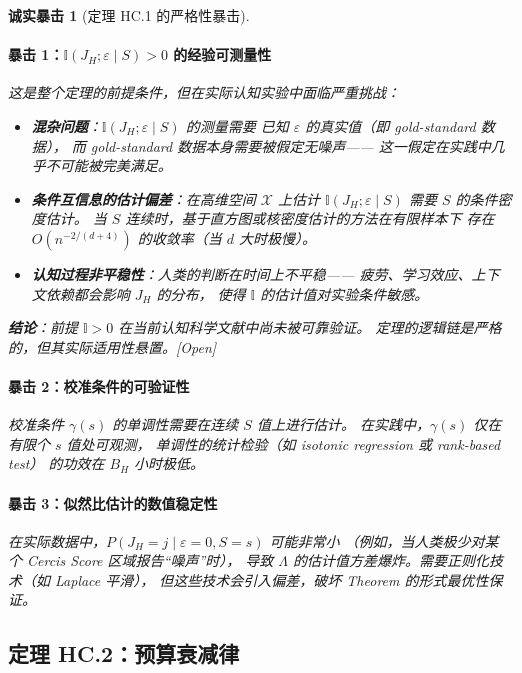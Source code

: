 \documentclass[12pt,a4paper]{article}
\newtheorem{critique}[theorem]{诚实暴击}
\newcommand{\openquest}{\textcolor{red!70!black}{\small\textsf{[Open]}}}
\newcommand{\I}{\mathbb{I}}
\newcommand{\cX}{\mathcal{X}}
\begin{document}
\begin{critique}[定理 HC.1 的严格性暴击]

\paragraph{暴击 1：$\I(J_H; \varepsilon \mid S) > 0$ 的经验可测量性}
这是整个定理的前提条件，但在实际认知实验中面临严重挑战：
\begin{itemize}
    \item \textbf{混杂问题}：$\I(J_H; \varepsilon \mid S)$ 的测量需要
          已知 $\varepsilon$ 的真实值（即 gold-standard 数据），
          而 gold-standard 数据本身需要被假定无噪声——
          这一假定在实践中几乎不可能被完美满足。
    \item \textbf{条件互信息的估计偏差}：在高维空间 $\cX$ 上估计
          $\I(J_H; \varepsilon \mid S)$ 需要 $S$ 的条件密度估计。
          当 $S$ 连续时，基于直方图或核密度估计的方法在有限样本下
          存在 $O(n^{-2/(d+4)})$ 的收敛率（当 $d$ 大时极慢）。
    \item \textbf{认知过程非平稳性}：人类的判断在时间上不平稳——
          疲劳、学习效应、上下文依赖都会影响 $J_H$ 的分布，
          使得 $\I$ 的估计值对实验条件敏感。
\end{itemize}
\textbf{结论}：前提 $\I > 0$ 在当前认知科学文献中尚未被可靠验证。
定理的逻辑链是严格的，但其实际适用性悬置。\openquest

\paragraph{暴击 2：校准条件的可验证性}
校准条件 $\gamma(s)$ 的单调性需要在连续 $S$ 值上进行估计。
在实践中，$\gamma(s)$ 仅在有限个 $s$ 值处可观测，
单调性的统计检验（如 isotonic regression 或 rank-based test）
的功效在 $B_H$ 小时极低。

\paragraph{暴击 3：似然比估计的数值稳定性}
在实际数据中，$P(J_H = j \mid \varepsilon=0, S=s)$ 可能非常小
（例如，当人类极少对某个 Cercis Score 区域报告``噪声''时），
导致 $\Lambda$ 的估计值方差爆炸。需要正则化技术（如 Laplace 平滑），
但这些技术会引入偏差，破坏 Theorem 的形式最优性保证。

\end{critique}

\subsection{定理 HC.2：预算衰减律}
\end{document}
